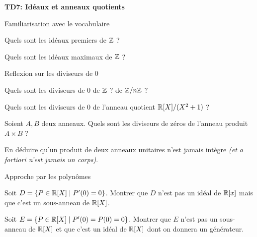 \documentclass{report}
\begin{document}
\begin{center}
    \huge{\textbf{TD7: Idéaux et anneaux quotients}}
\end{center}

\begin{exo} Familiarisation avec le vocabulaire
    \begin{q}{1}
        Quels sont les idéaux premiers de \(\mathbb{Z}\) ?
    \end{q}
    \begin{q}{1}
        Quels sont les idéaux maximaux de \(\mathbb{Z}\) ?
    \end{q}
\end{exo}

\begin{exo} Reflexion sur les diviseurs de \(0\)
    \begin{q}{1}
        Quels sont les diviseurs de \(0\) de \(\mathbb{Z}\) ? de \(\mathbb{Z}/n\mathbb{Z}\) ?
    \end{q}
    \begin{q}{2}
        Quels sont les diviseurs de \(0\) de l'anneau quotient \(\mathbb{R}[X]/(X^2+1)\) ?
    \end{q}
    \begin{q}{3}
        Soient \(A,B\) deux anneaux. Quels sont les diviseurs de zéros de l'anneau
        produit \(A\times B\) ?
    \end{q}
    \begin{q}{4}
        En déduire qu'un produit de deux anneaux unitaires n'est jamais intègre
        \textit{(et a fortiori n'est jamais un corps)}.
    \end{q}
\end{exo}

\begin{exo} Approche par les polynômes
    \begin{q}{1}
        Soit \(D=\{P\in\mathbb{R}[X]\mid P'(0)=0\}\). Montrer que \(D\) n'est pas un idéal de
        \(\mathbb{R}[x]\) mais que c'est un sous-anneau de \(\mathbb{R}[X]\).
    \end{q}
    \begin{q}{2}
        Soit \(E=\{P\in\mathbb{R}[X]\mid P'(0)=P(0)=0\}\). Montrer que \(E\) n'est pas un
        sous-anneau de \(\mathbb{R}[X]\) et que c'est un idéal de \(\mathbb{R}[X]\) dont on
        donnera un générateur.
    \end{q}
\end{exo}
\end{document}
